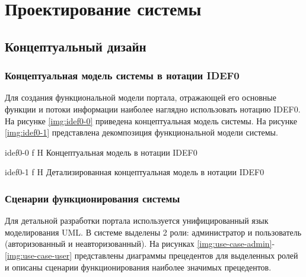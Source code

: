 \chapter*{Проектирование системы}

\section*{Концептуальный дизайн}

\subsection*{Концептуальная модель системы в нотации IDEF0}

Для создания функциональной модели портала, отражающей его основные функции и потоки информации наиболее наглядно использовать нотацию IDEF0. На рисунке \ref{img:idef0-0} приведена концептуальная модель системы. На рисунке \ref{img:idef0-1} представлена декомпозиция функциональной модели системы.

{idef0-0} %
{f} %
{H} %
{\textwidth} %
{Концептуальная модель в нотации IDEF0} %

{idef0-1} %
{f} %
{H} %
{\textwidth} %
{Детализированная концептуальная модель в нотации IDEF0} %


\subsection*{Сценарии функционирования системы}

Для детальной разработки портала используется унифицированный язык моделирования UML. В системе выделены 2 роли: администратор и пользователь (авторизованный и неавторизованный). На рисунках \ref{img:use-case-admin}-\ref{img:use-case-user} представлены диаграммы прецедентов для выделенных ролей и описаны сценарии функционирования наиболее значимых прецедентов.

